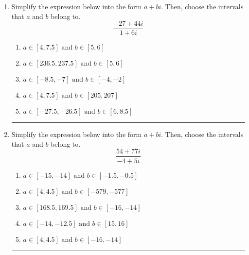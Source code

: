 \documentclass[14pt]{extbook}
\newcommand{\litem}[1]{\item#1\hspace*{-1cm}\rule{\textwidth}{0.4pt}}
\begin{document}
\begin{enumerate}
{\begin{enumerate}[label=\Alph*.]
\end{enumerate} }
\litem{
Simplify the expression below into the form $a+bi$. Then, choose the intervals that $a$ and $b$ belong to.\[ \frac{-27 + 44 i}{1 + 6 i} \]\begin{enumerate}[label=\Alph*.]
\item \( a \in [4, 7.5] \text{ and } b \in [5, 6] \)
\item \( a \in [236.5, 237.5] \text{ and } b \in [5, 6] \)
\item \( a \in [-8.5, -7] \text{ and } b \in [-4, -2] \)
\item \( a \in [4, 7.5] \text{ and } b \in [205, 207] \)
\item \( a \in [-27.5, -26.5] \text{ and } b \in [6, 8.5] \)

\end{enumerate} }
\litem{
Simplify the expression below into the form $a+bi$. Then, choose the intervals that $a$ and $b$ belong to.\[ \frac{54 + 77 i}{-4 + 5 i} \]\begin{enumerate}[label=\Alph*.]
\item \( a \in [-15, -14] \text{ and } b \in [-1.5, -0.5] \)
\item \( a \in [4, 4.5] \text{ and } b \in [-579, -577] \)
\item \( a \in [168.5, 169.5] \text{ and } b \in [-16, -14] \)
\item \( a \in [-14, -12.5] \text{ and } b \in [15, 16] \)
\item \( a \in [4, 4.5] \text{ and } b \in [-16, -14] \)

\end{enumerate} }
\end{enumerate}
\end{document}
